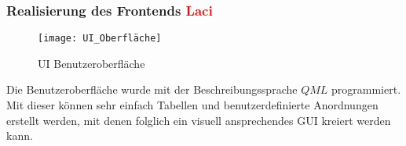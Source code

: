 \documentclass[titlepage,12pt,twoside]{article}
\begin{document}
\subsubsection{Realisierung des Frontends \textcolor{red}{Laci}}
\begin{figure}[H]
	\begin{center}
		\scalebox{1.2}
		{\texttt{[image: UI\_Oberfläche]}}
		\caption{UI Benutzeroberfläche}
		\label{fig:UI_Oberfläche}				
	\end{center}
\end{figure}
\hfill \break
Die Benutzeroberfläche wurde mit der Beschreibungssprache $QML$ programmiert. Mit dieser können sehr einfach Tabellen und benutzerdefinierte
Anordnungen erstellt werden, mit denen folglich ein visuell ansprechendes GUI kreiert werden kann. \\
\\
\end{document}
